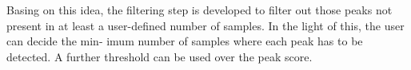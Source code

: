 

Basing on this idea, the filtering step is developed to filter out those peaks not present in at least a user-defined number of samples. In the light of this, the user can decide the min-
imum number of samples where each peak has to be detected. A further threshold can be used over
the peak score.